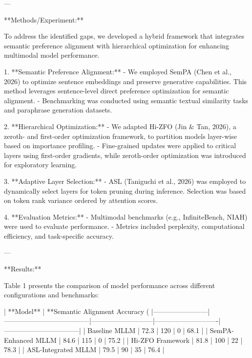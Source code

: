 ---

**Methods/Experiment:**  

To address the identified gaps, we developed a hybrid framework that integrates semantic preference alignment with hierarchical optimization for enhancing multimodal model performance.  

1. **Semantic Preference Alignment:**  
   - We employed SemPA (Chen et al., 2026) to optimize sentence embeddings and preserve generative capabilities. This method leverages sentence-level direct preference optimization for semantic alignment.  
   - Benchmarking was conducted using semantic textual similarity tasks and paraphrase generation datasets.  

2. **Hierarchical Optimization:**  
   - We adapted Hi-ZFO (Jin & Tan, 2026), a zeroth- and first-order optimization framework, to partition models layer-wise based on importance profiling.  
   - Fine-grained updates were applied to critical layers using first-order gradients, while zeroth-order optimization was introduced for exploratory learning.  

3. **Adaptive Layer Selection:**  
   - ASL (Taniguchi et al., 2026) was employed to dynamically select layers for token pruning during inference. Selection was based on token rank variance ordered by attention scores.  

4. **Evaluation Metrics:**  
   - Multimodal benchmarks (e.g., InfiniteBench, NIAH) were used to evaluate performance.  
   - Metrics included perplexity, computational efficiency, and task-specific accuracy.  

---

**Results:**  

Table 1 presents the comparison of model performance across different configurations and benchmarks:  

| **Model**             | **Semantic Alignment Accuracy (%
|------------------------|--------------------------------------|---------------------------|----------------------------|---------------------------------|  
| Baseline MLLM         | 72.3                                | 120                       | 0                          | 68.1                           |  
| SemPA-Enhanced MLLM   | 84.6                                | 115                       | 0                          | 75.2                           |  
| Hi-ZFO Framework      | 81.8                                | 100                       | 22                         | 78.3                           |  
| ASL-Integrated MLLM   | 79.5                                | 90                        | 35                         | 76.4                           |  

